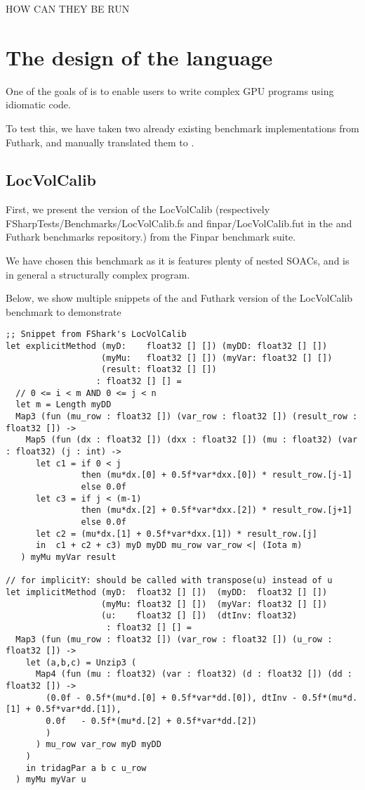 HOW CAN THEY BE RUN



\section{The design of the \fshark{} language}
\label{sec:fsharklanguageeval}
One of the goals of \fshark{} is to enable users to write complex GPU programs
using idiomatic \fsharp{} code.

To test this, we have taken two already existing benchmark implementations from
Futhark, and manually translated them to \fshark{}.

\subsection{LocVolCalib}
First, we present the \fshark{} version of the LocVolCalib (respectively
FSharpTests/Benchmarks/LocVolCalib.fs and finpar/LocVolCalib.fut in the
\fshark{} and Futhark benchmarks repository.) from the Finpar\cite{finpar}
benchmark suite.

We have chosen this benchmark as it is features plenty of nested SOACs, and is
in general a structurally complex program.

Below, we show multiple snippets of the \fshark{} and Futhark version of the
LocVolCalib benchmark to demonstrate
\begin{verbatim}
;; Snippet from FShark's LocVolCalib
let explicitMethod (myD:    float32 [] []) (myDD: float32 [] [])
                   (myMu:   float32 [] []) (myVar: float32 [] [])
                   (result: float32 [] [])
                  : float32 [] [] =
  // 0 <= i < m AND 0 <= j < n
  let m = Length myDD
  Map3 (fun (mu_row : float32 []) (var_row : float32 []) (result_row : float32 []) ->
    Map5 (fun (dx : float32 []) (dxx : float32 []) (mu : float32) (var : float32) (j : int) ->
      let c1 = if 0 < j
               then (mu*dx.[0] + 0.5f*var*dxx.[0]) * result_row.[j-1]
               else 0.0f
      let c3 = if j < (m-1)
               then (mu*dx.[2] + 0.5f*var*dxx.[2]) * result_row.[j+1]
               else 0.0f
      let c2 = (mu*dx.[1] + 0.5f*var*dxx.[1]) * result_row.[j]
      in  c1 + c2 + c3) myD myDD mu_row var_row <| (Iota m)
   ) myMu myVar result

// for implicitY: should be called with transpose(u) instead of u
let implicitMethod (myD:  float32 [] [])  (myDD:  float32 [] [])
                   (myMu: float32 [] [])  (myVar: float32 [] [])
                   (u:    float32 [] [])  (dtInv: float32)
                    : float32 [] [] =
  Map3 (fun (mu_row : float32 []) (var_row : float32 []) (u_row : float32 []) ->
    let (a,b,c) = Unzip3 (
      Map4 (fun (mu : float32) (var : float32) (d : float32 []) (dd : float32 []) ->
        (0.0f - 0.5f*(mu*d.[0] + 0.5f*var*dd.[0]), dtInv - 0.5f*(mu*d.[1] + 0.5f*var*dd.[1]), 
        0.0f   - 0.5f*(mu*d.[2] + 0.5f*var*dd.[2])
        )
      ) mu_row var_row myD myDD
    )
    in tridagPar a b c u_row
  ) myMu myVar u
\end{verbatim}

